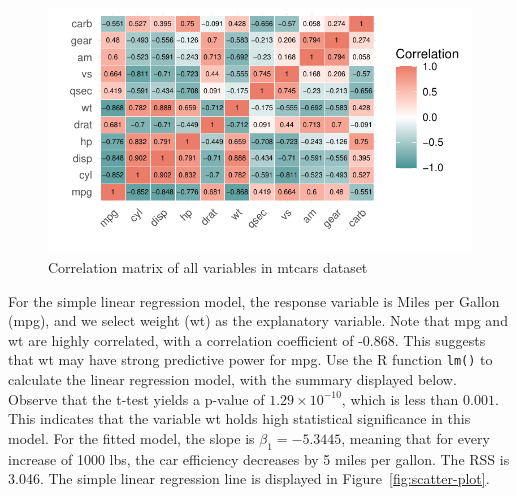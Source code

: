 \documentclass{article}\usepackage[]{graphicx}\usepackage[]{xcolor}
\makeatletter
\def\maxwidth{ %
  \ifdim\Gin@nat@width>\linewidth
    \linewidth
  \else
    \Gin@nat@width
  \fi
}
\newenvironment{knitrout}{}{} %
\numberwithin{equation}{section}
\makeatother
\begin{document}
\begin{knitrout}\scriptsize
{}\color{fgcolor}\begin{figure}[H]

{\centering \includegraphics[width=\maxwidth]{figure/beamer-cor-matrix-mtcars2-1} 

}

\caption[Correlation matrix of all variables in mtcars dataset]{Correlation matrix of all variables in mtcars dataset}\label{fig:cor-matrix-mtcars2}
\end{figure}

\end{knitrout}

\noindent
For the simple linear regression model, the response variable is Miles per Gallon (mpg), and we select weight (wt) as the explanatory variable. Note that mpg and wt are highly correlated, with a correlation coefficient of -0.868. This suggests that wt may have strong predictive power for mpg. Use the R function \texttt{lm()} to calculate the linear regression model, with the summary displayed below.\\

\noindent
Observe that the t-test yields a p-value of $1.29 \times 10^{-10}$, which is less than $0.001$. This indicates that the variable wt holds high statistical significance in this model. For the fitted model, the slope is $\beta_1 = -5.3445$, meaning that for every increase of 1000 lbs, the car efficiency decreases by 5 miles per gallon. The RSS is 3.046. The simple linear regression line is displayed in Figure~\ref{fig:scatter-plot}.
\end{document}

